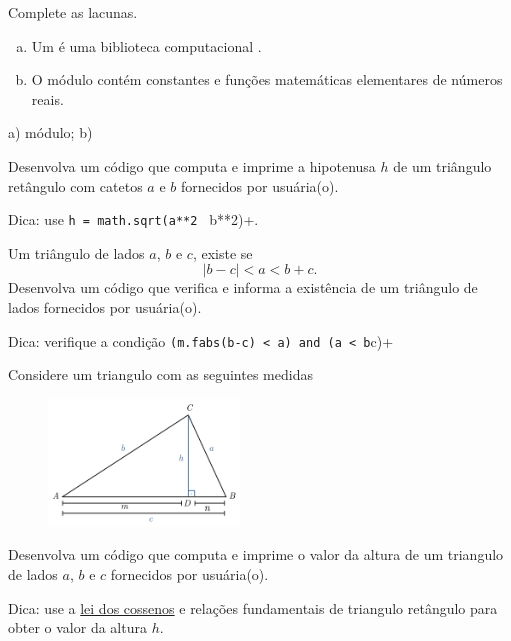 \begin{exer}
  Complete as lacunas.
  \begin{enumerate}[a)]
    \item Um \underline{\phantom{módulo}} é uma biblioteca computacional {\python}.
    \item O módulo \underline{\phantom{{\PYTHONmath}}} contém constantes e funções matemáticas elementares de números reais.
  \end{enumerate}
\end{exer}
\begin{resp}
  a) módulo; b) {\PYTHONmath}
\end{resp}


\begin{exer}
  Desenvolva um código que computa e imprime a hipotenusa $h$ de um triângulo retângulo com catetos $a$ e $b$ fornecidos por usuária(o).
\end{exer}
\begin{resp}
  Dica: use \lstinline+h = math.sqrt(a**2 + b**2)+.
\end{resp}

\begin{exer}
  Um triângulo de lados $a$, $b$ e $c$, existe se
  \begin{equation}
    |b-c| < a < b + c.
  \end{equation}
  Desenvolva um código que verifica e informa a existência de um triângulo de lados fornecidos por usuária(o).
\end{exer}
\begin{resp}
  Dica: verifique a condição \lstinline+(m.fabs(b-c) < a) and (a < b+c)+
\end{resp}

\begin{exer}
  Considere um triangulo com as seguintes medidas
  \begin{figure}[H]
    \centering
    \includegraphics[width=2in]{./cap_fun/dados/fig_leiDosCossenos/fig.png}
  \end{figure}
  Desenvolva um código que computa e imprime o valor da altura de um triangulo de lados $a$, $b$ e $c$ fornecidos por usuária(o).
\end{exer}
\begin{resp}
  Dica: use a \href{https://pt.wikipedia.org/wiki/Lei_dos_cossenos}{lei dos cossenos} e relações fundamentais de triangulo retângulo para obter o valor da altura $h$. 
\end{resp}


